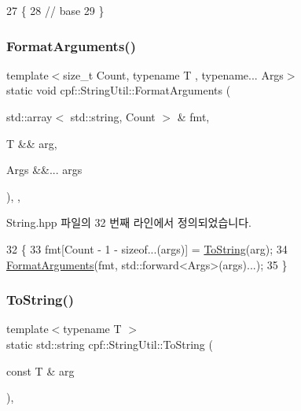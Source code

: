 \begin{DoxyCode}
27                                                                             \{
28             \textcolor{comment}{// base}
29         \}
\end{DoxyCode}
\mbox{\label{classcpf_1_1_string_util_a42ad0dd4e29fef98117340ae1193cd95}} 
\subsubsection{\texorpdfstring{Format\+Arguments()}{FormatArguments()}\hspace{0.1cm}{\footnotesize\ttfamily [2/2]}}
{\footnotesize\ttfamily template$<$size\+\_\+t Count, typename T , typename... Args$>$ \\
static void cpf\+::\+String\+Util\+::\+Format\+Arguments (\begin{DoxyParamCaption}\item[{std\+::array$<$ std\+::string, Count $>$ \&}]{fmt,  }\item[{T \&\&}]{arg,  }\item[{Args \&\&...}]{args }\end{DoxyParamCaption})\hspace{0.3cm}{\ttfamily [inline]}, {\ttfamily [static]}, {\ttfamily [private]}}



String.\+hpp 파일의 32 번째 라인에서 정의되었습니다.


\begin{DoxyCode}
32                                                                                                     \{
33             fmt[Count - 1 - \textcolor{keyword}{sizeof}...(args)] = \hyperlink{classcpf_1_1_string_util_a53a8571bef952fecc7008f309171b8c5}{ToString}(arg);
34             \hyperlink{classcpf_1_1_string_util_af6a0483e9f189a49f9f25a6ca74d94a2}{FormatArguments}(fmt, std::forward<Args>(args)...);
35         \}
\end{DoxyCode}
\mbox{\label{classcpf_1_1_string_util_a53a8571bef952fecc7008f309171b8c5}} 
\subsubsection{\texorpdfstring{To\+String()}{ToString()}}
{\footnotesize\ttfamily template$<$typename T $>$ \\
static std\+::string cpf\+::\+String\+Util\+::\+To\+String (\begin{DoxyParamCaption}\item[{const T \&}]{arg }\end{DoxyParamCaption})\hspace{0.3cm}{\ttfamily [inline]}, {\ttfamily [static]}}



